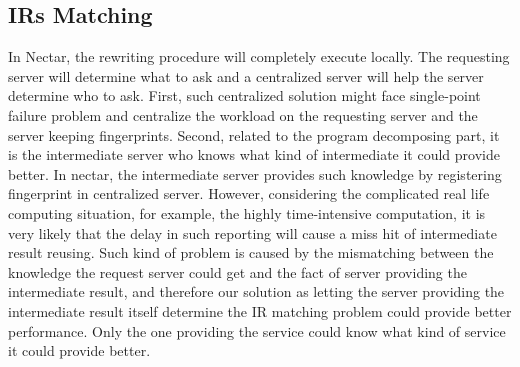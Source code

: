 \subsection{IRs Matching}
In Nectar, the rewriting procedure will completely execute locally. The requesting server will determine what to ask and a centralized server will help the server determine who to ask. First, such centralized solution might face single-point failure problem and centralize the workload on the requesting server and the server keeping fingerprints. Second, related to the program decomposing part, it is the intermediate server who knows what kind of intermediate it could provide better. In nectar, the intermediate server provides such knowledge by registering fingerprint in centralized server. However, considering the complicated real life computing situation, for example, the highly time-intensive computation, it is very likely that the delay in such reporting will cause a miss hit of intermediate result reusing. Such kind of problem is caused by the mismatching between the knowledge the request server could get and the fact of server providing the intermediate result, and therefore our solution as letting the server providing the intermediate result itself determine the IR matching problem could provide better performance. Only the one providing the service could know what kind of service it could provide better.
